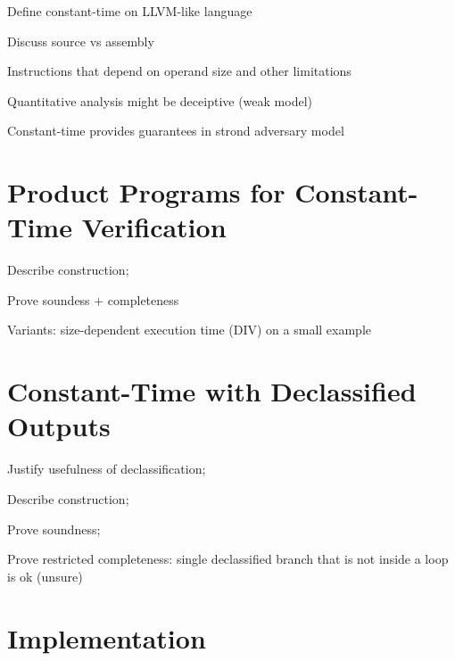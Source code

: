 \documentclass[letterpaper,10pt]{IEEEtran} %
\begin{document}
\begin{compactitem}
\item Define constant-time on LLVM-like language
\item Discuss source vs assembly
\item Instructions that depend on operand size and other limitations
\item Quantitative analysis might be deceiptive (weak model)
\item Constant-time provides guarantees in strond adversary model
\end{compactitem}

\section{Product Programs for Constant-Time Verification}

\begin{compactitem}
\item Describe construction;
\item Prove soundess + completeness
\item Variants: size-dependent execution time (DIV) on a small example
\end{compactitem}

\section{Constant-Time with Declassified Outputs}

\begin{compactitem}
\item Justify usefulness of declassification;
\item Describe construction;
\item Prove soundness;
\item Prove restricted completeness: single declassified branch that
  is not inside a loop is ok (unsure)
\end{compactitem}

\section{Implementation}
\end{document}
